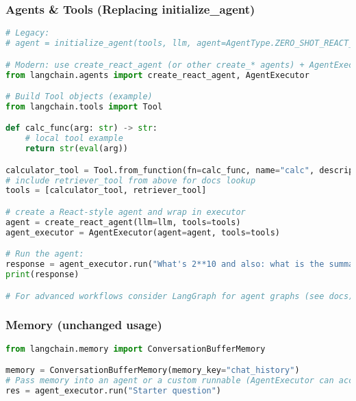 \begin{frame}[fragile]\frametitle{Agents \& Tools (Replacing initialize_agent)}
\begin{lstlisting}[language=python,basicstyle=\tiny]
# Legacy:
# agent = initialize_agent(tools, llm, agent=AgentType.ZERO_SHOT_REACT_DESCRIPTION)

# Modern: use create_react_agent (or other create_* agents) + AgentExecutor
from langchain.agents import create_react_agent, AgentExecutor

# Build Tool objects (example)
from langchain.tools import Tool

def calc_func(arg: str) -> str:
    # local tool example
    return str(eval(arg))

calculator_tool = Tool.from_function(fn=calc_func, name="calc", description="Evaluate math expressions")
# include retriever_tool from above for docs lookup
tools = [calculator_tool, retriever_tool]

# create a React-style agent and wrap in executor
agent = create_react_agent(llm=llm, tools=tools)
agent_executor = AgentExecutor(agent=agent, tools=tools)

# Run the agent:
response = agent_executor.run("What's 2**10 and also: what is the summary of the docs about deployment?")
print(response)

# For advanced workflows consider LangGraph for agent graphs (see docs)
\end{lstlisting}
\end{frame}

\begin{frame}[fragile]\frametitle{Memory (unchanged usage)}
\begin{lstlisting}[language=python,basicstyle=\tiny]
from langchain.memory import ConversationBufferMemory

memory = ConversationBufferMemory(memory_key="chat_history")
# Pass memory into an agent or a custom runnable (AgentExecutor can accept memory in its run)
res = agent_executor.run("Starter question")
\end{lstlisting}
\end{frame}

